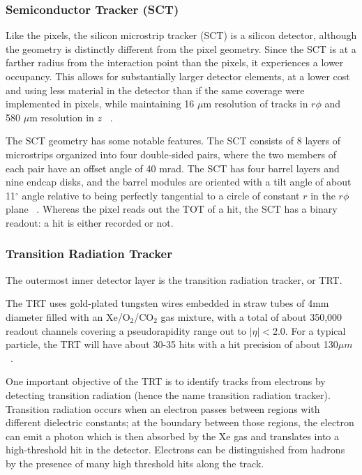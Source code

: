 \subsubsection{Semiconductor Tracker (SCT)}
\label{sec:sct}
Like the pixels, the silicon microstrip tracker (SCT) is a silicon detector, although the geometry is 
distinctly different from the pixel geometry.  Since the SCT is at a farther radius from the interaction point than 
the pixels, it experiences a lower occupancy.  This allows for substantially larger detector elements, at a lower 
cost and using less material in the detector than if the same coverage were implemented in pixels, while maintaining 
16 $\mu$m resolution of tracks in $r\phi$ and 580 $\mu$m resolution in $z$ ~\cite{sct_res}.   

The SCT geometry has some notable features.  The SCT consists of 8 layers of microstrips organized into four 
double-sided pairs, where the two members of each pair have an offset angle of 40 mrad.  The 
SCT has four barrel layers and nine endcap disks, and the barrel modules are oriented with a tilt angle 
of about 11$^\circ$ angle relative to being perfectly tangential to a circle of constant $r$ in the 
$r\phi$ plane ~\cite{tdr}.  Whereas the 
pixel reads out the TOT of a hit, the SCT has a binary readout: a hit is either recorded or not.



\subsubsection{Transition Radiation Tracker}
\label{sec:trt}
The outermost inner detector layer is the transition radiation tracker, or TRT.  

The TRT uses gold-plated tungsten wires embedded in straw tubes of 4mm diameter filled with an Xe/O$_2$/CO$_2$ 
gas mixture, with a total of about 350,000 readout channels covering a pseudorapidity range out to $|\eta|<$2.0.
  For a typical particle, the TRT will have about 30-35 hits with a hit precision of about 130$\mu m$ ~\cite{trt}.

One important objective of the TRT is to identify tracks from electrons by detecting transition radiation (hence the name 
transition radiation tracker).  Transition radiation occurs when an electron passes between regions with different 
dielectric constants; at the boundary between those regions, the electron can emit a photon which is then absorbed 
by the Xe gas and translates into a high-threshold hit in the detector.  Electrons can be distinguished 
from hadrons by the presence of many high threshold hits along the track.

